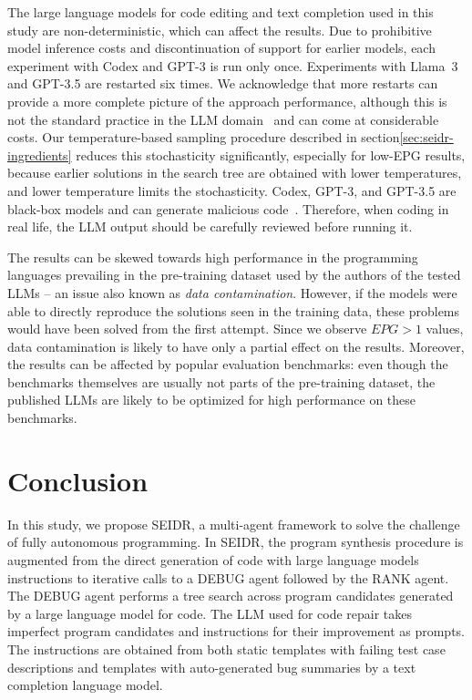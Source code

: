 The large language models for code editing and text completion used in this study are non-deterministic, 
which can affect the results. 
Due to prohibitive model inference costs and discontinuation of support for earlier models, each experiment with Codex and GPT-3 is run only once. 
Experiments with Llama~3 and GPT-3.5 are restarted six times. 
We acknowledge that more restarts can provide a more complete picture of the approach performance,
although this is not the standard practice in the LLM domain~\cite{ouyangLLMBoxChocolates2023} 
and can come at considerable costs.
Our temperature-based sampling procedure described in section\ref{sec:seidr-ingredients} reduces this stochasticity significantly, especially for low-EPG results, because earlier solutions in the search tree are obtained with lower temperatures, and lower temperature limits the stochasticity.
Codex, GPT-3, and GPT-3.5 are black-box models and can generate malicious code~\cite{pearceAsleepKeyboardAssessing2022}. 
Therefore, when coding in real life, the LLM output should be carefully reviewed before running it.

The results can be skewed towards high performance in the programming languages prevailing in the pre-training dataset used by the authors of the tested LLMs -- an issue also known as \emph{data contamination}.
However, if the models were able to directly reproduce the solutions seen in the training data, 
these problems would have been solved from the first attempt.
Since we observe $EPG>1$ values, data contamination is likely to have only a partial effect on the results.
Moreover, the results can be affected by popular evaluation benchmarks: even though the benchmarks themselves are usually not parts of the pre-training dataset, the published LLMs are likely to be optimized for high performance on these benchmarks.   

\newpage\section{Conclusion}
\label{sec:seidr-conclusion}

In this study, we propose SEIDR, a multi-agent framework to solve the challenge of fully autonomous programming. 
In SEIDR, the program synthesis procedure is augmented from the direct generation of code with large language models instructions to iterative calls to a DEBUG agent followed by the RANK agent. 
The DEBUG agent performs a tree search across program candidates generated by a large language model for code.
The LLM used for code repair takes imperfect program candidates and instructions for their improvement as prompts. 
The instructions are obtained from both static templates with failing test case descriptions and templates with auto-generated bug summaries by a text completion language model. 

